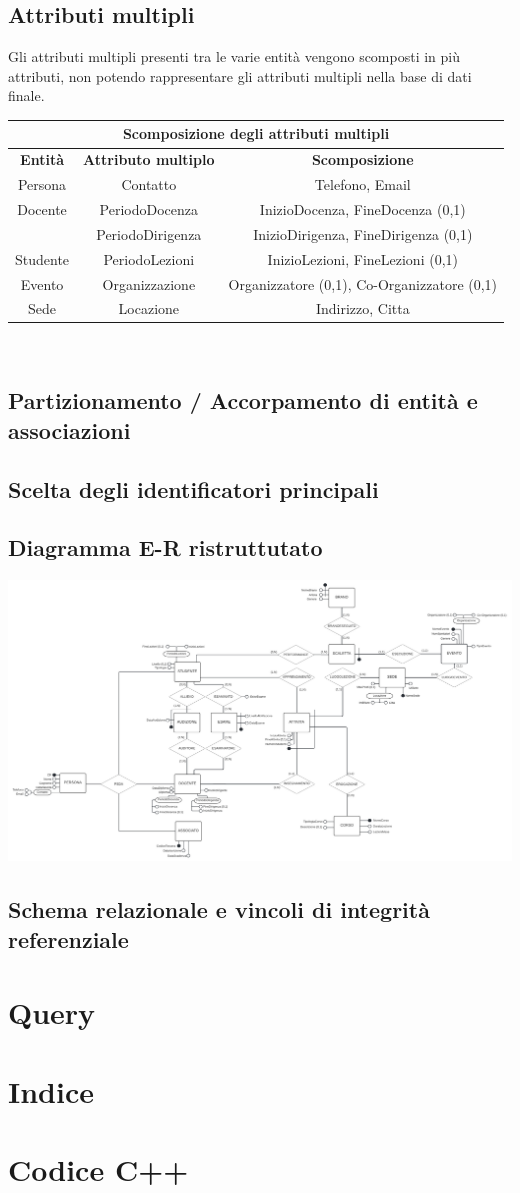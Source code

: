 \documentclass[11pt]{article}
\begin{document}
	\subsection{Attributi multipli}
		Gli attributi multipli presenti tra le varie entità vengono scomposti in più attributi, non potendo rappresentare gli attributi multipli nella base di dati finale.\\
		\begin{tabular}{|c|c|c|}
			\hline
			\multicolumn{3}{|c|}{Scomposizione degli attributi multipli}\\
			\hline
			\textbf{Entità} & \textbf{Attributo multiplo} & \textbf{Scomposizione}\\
			\hline
			Persona&Contatto&Telefono, Email\\
			\hline
			Docente&PeriodoDocenza&InizioDocenza, FineDocenza (0,1)\\
			&PeriodoDirigenza&InizioDirigenza, FineDirigenza (0,1)\\
			\hline
			Studente&PeriodoLezioni&InizioLezioni, FineLezioni (0,1)\\
			\hline
			Evento&Organizzazione&Organizzatore (0,1), Co-Organizzatore (0,1)\\
			\hline
			Sede&Locazione&Indirizzo, Citta\\
			\hline
		\end{tabular}\\
	\subsection{Partizionamento / Accorpamento di entità e associazioni}
	\subsection{Scelta degli identificatori principali}
	\subsection{Diagramma E-R ristruttutato}
		\includegraphics[scale=0.55]{../SchemaConcettuale/ER-LUCIDCHART - ER-concettuale 2.jpeg}
	\subsection{Schema relazionale e vincoli di integrità referenziale}
\section{Query}
\section{Indice}
\section{Codice C++}
\end{document}
